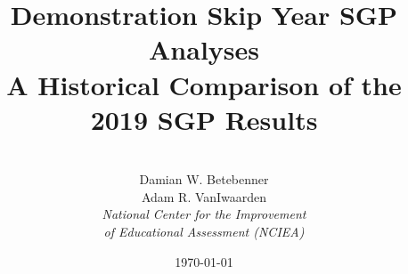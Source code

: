 \documentclass[12pt]{article}
\begin{document}
\title{\textsf{\LARGE Demonstration Skip Year SGP Analyses  \\\medskip A
Historical Comparison of the 2019 SGP Results }}
\author{ \vspace{12pt} \\   Damian W. Betebenner    \\   Adam R.
VanIwaarden   
         \vspace{15pt} \\   \emph{ National Center for the
Improvement }   \\   \emph{ of Educational Assessment
(NCIEA) }   \\ \vspace{25pt}}

 \date{\today} 

\maketitle

\newpage
 
\end{document}
